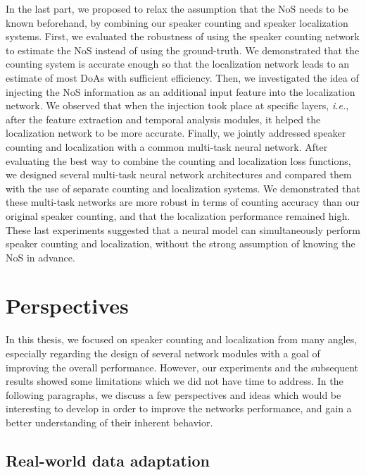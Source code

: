 In the last part, we proposed to relax the assumption that the NoS needs to be known beforehand, by combining our speaker counting and speaker localization systems. First, we evaluated the robustness of using the speaker counting network to estimate the NoS instead of using the ground-truth. We demonstrated that the counting system is accurate enough so that the localization network leads to an estimate of most DoAs with sufficient efficiency. Then, we investigated the idea of injecting the NoS information as an additional input feature into the localization network. We observed that when the injection took place at specific layers, \emph{i.e.}, after the feature extraction and temporal analysis modules, it helped the localization network to be more accurate. Finally, we jointly addressed speaker counting and localization with a common multi-task neural network. After evaluating the best way to combine the counting and localization loss functions, we designed several multi-task neural network architectures and compared them with the use of separate counting and localization systems. We demonstrated that these multi-task networks are more robust in terms of counting accuracy than our original speaker counting, and that the localization performance remained high. These last experiments suggested that a neural model can simultaneously perform speaker counting and localization, without the strong assumption of knowing the NoS in advance.

\section{Perspectives}

In this thesis, we focused on speaker counting and localization from many angles, especially regarding the design of several network modules with a goal of improving the overall performance. However, our experiments and the subsequent results showed some limitations which we did not have time to address. In the following paragraphs, we discuss a few perspectives and ideas which would be interesting to develop in order to improve the networks performance, and gain a better understanding of their inherent behavior.

\subsection{Real-world data adaptation}

